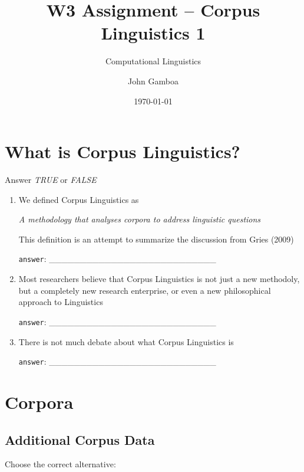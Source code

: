 \documentclass[a4paper,11pt]{scrartcl}
\title{W3 Assignment -- Corpus Linguistics 1}
\subtitle{Computational Linguistics}
\author{John Gamboa}
\date{\today}
\begin{document}
\maketitle

\section{What is Corpus Linguistics?}

Answer \textit{TRUE} or \textit{FALSE}

\begin{enumerate}[label=\alph*)]
\singlespacing%
\item We defined Corpus Linguistics as

\textit{A methodology that analyses corpora to address linguistic questions}

This definition is an attempt to summarize the discussion from Gries (2009)

\verb|answer|: \_\_\_\_\_\_\_\_\_\_\_\_\_\_\_\_\_\_\_\_\_\_\_\_\_\_\_


\item Most researchers believe that Corpus Linguistics is not just a new methodoly, but a completely new research enterprise, or even a new philosophical approach to Linguistics

\verb|answer|: \_\_\_\_\_\_\_\_\_\_\_\_\_\_\_\_\_\_\_\_\_\_\_\_\_\_\_


\item There is not much debate about what Corpus Linguistics is

\verb|answer|: \_\_\_\_\_\_\_\_\_\_\_\_\_\_\_\_\_\_\_\_\_\_\_\_\_\_\_

\end{enumerate}


\section{Corpora}

\subsection{Additional Corpus Data}

Choose the correct alternative:
\end{document}
